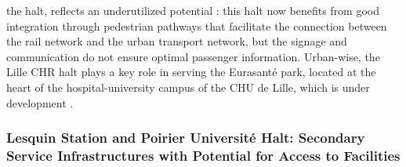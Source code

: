 \begin{refsegment}
the halt, reflects an underutilized potential \textcolor{blue}{\autocite[130]{fleury_gestion_2002}}: this halt now benefits from good integration through pedestrian pathways that facilitate the connection between the rail network and the urban transport network, but the signage and communication do not ensure optimal passenger information. Urban-wise, the Lille CHR halt plays a key role in serving the Eurasanté park, located at the heart of the hospital-university campus of the CHU de Lille, which is under development \textcolor{blue}{\autocite[130]{fleury_gestion_2002}}.%

\subsubsection*{Lesquin Station and Poirier Université Halt: Secondary Service Infrastructures with Potential for Access to Facilities
    \label{chap3:application-observation-quantitative-lesquin-poirier-universite}
    }


\end{refsegment}
